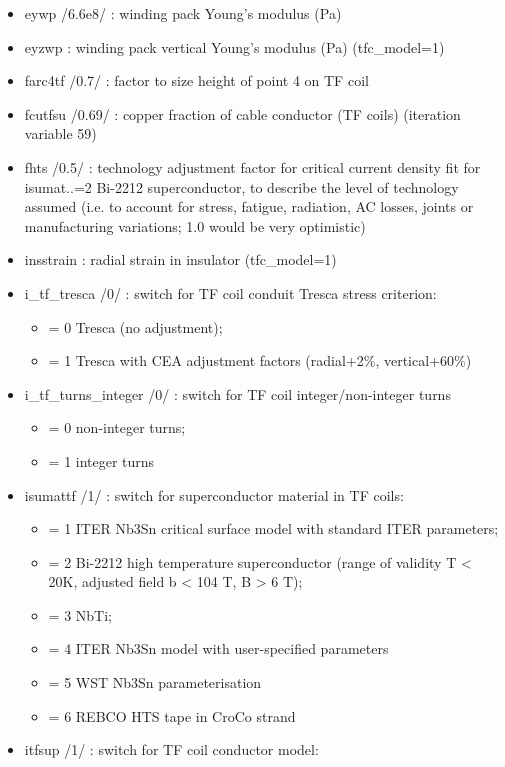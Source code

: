 \documentclass[]{article}
\providecommand{\tightlist}{%
  \setlength{\itemsep}{0pt}\setlength{\parskip}{0pt}}
\begin{document}
\begin{itemize}
\begin{itemize}
  \item
    eywp /6.6e8/ : winding pack Young's modulus (Pa)
  \item
    eyzwp : winding pack vertical Young's modulus (Pa) (tfc\_model=1)
  \item
    farc4tf /0.7/ : factor to size height of point 4 on TF coil
  \item
    fcutfsu /0.69/ : copper fraction of cable conductor (TF coils)
    (iteration variable 59)
  \item
    fhts /0.5/ : technology adjustment factor for critical current
    density fit for isumat..=2 Bi-2212 superconductor, to describe the
    level of technology assumed (i.e. to account for stress, fatigue,
    radiation, AC losses, joints or manufacturing variations; 1.0 would
    be very optimistic)
  \item
    insstrain : radial strain in insulator (tfc\_model=1)
  \item
    i\_tf\_tresca /0/ : switch for TF coil conduit Tresca stress
    criterion:

    \begin{itemize}
    \tightlist
    \item
      = 0 Tresca (no adjustment);
    \item
      = 1 Tresca with CEA adjustment factors (radial+2\%, vertical+60\%)
    \end{itemize}
  \item
    i\_tf\_turns\_integer /0/ : switch for TF coil integer/non-integer
    turns

    \begin{itemize}
    \tightlist
    \item
      = 0 non-integer turns;
    \item
      = 1 integer turns
    \end{itemize}
  \item
    isumattf /1/ : switch for superconductor material in TF coils:

    \begin{itemize}
    \tightlist
    \item
      = 1 ITER Nb3Sn critical surface model with standard ITER
      parameters;
    \item
      = 2 Bi-2212 high temperature superconductor (range of validity T
      \textless{} 20K, adjusted field b \textless{} 104 T, B
      \textgreater{} 6 T);
    \item
      = 3 NbTi;
    \item
      = 4 ITER Nb3Sn model with user-specified parameters
    \item
      = 5 WST Nb3Sn parameterisation
    \item
      = 6 REBCO HTS tape in CroCo strand
    \end{itemize}
  \item
    itfsup /1/ : switch for TF coil conductor model:


\end{itemize}
\end{itemize}
\end{document}
